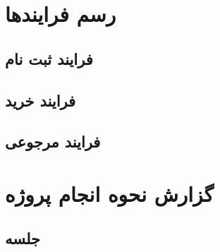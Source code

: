 \documentclass[12pt,a4paper]{article}
\begin{document}
\maketitle
\pagebreak
\tableofcontents
\pagebreak
\normalsize	



\pagebreak
\section{رسم فرایندها} \label{section.function}

\subsection{فرایند ثبت نام} \label{section.function.register}


\subsection{فرایند خرید} \label{section.function.buy}


\subsection{فرایند مرجوعی} \label{section.function.return}


\section{گزارش نحوه انجام پروژه} \label{section.report}

\subsection{جلسه } \label{section.report.postMortem}


\subsection{} \label{section.report.taskBoard}


\subsection{} \label{section.report.burndownChart}
\end{document}
